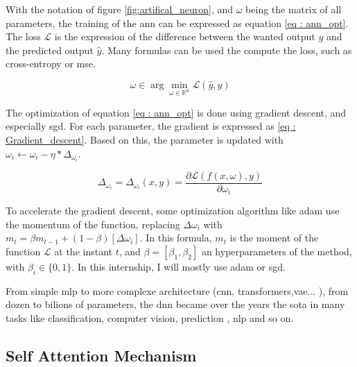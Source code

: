 With the notation of figure \ref{fig:artifical_neuron}, and $\omega$ being the matrix of all parameters, the training of the \acrshort{ann} can be expressed as equation \ref{eq : ann_opt}. The loss $\mathcal L$ is the expression of the difference between the wanted output $y$ and the predicted output $\hat y$. Many formulas can be used the compute the loss, such as cross-entropy\cite{zhang_generalized_2018} or \acrfull{mse}.

\begin{equation}
    \omega \in \arg \min_{\omega \in \mathbb R^n} \mathcal L(\hat{y},y)
    \label{eq : ann_opt}
\end{equation}

The optimization of equation \ref{eq : ann_opt} is done using gradient descent, and especially \acrfull{sgd}. For each parameter, the gradient is expressed as \ref{eq : Gradient_descent}. Based on this, the parameter is updated with $\omega_{i} \gets \omega_i - \eta * \Delta_{\omega_i}$.

\begin{equation}
    \Delta_{\omega_i}=\Delta_{\omega_i}(x,y)=\frac{\partial \mathcal L(f(x,\omega),y)}{\partial \omega_i}
\label{eq : Gradient_descent}
\end{equation}

To accelerate the gradient descent, some optimization algorithm like \acrfull{adam} \cite{kingma_adam_2017} use the momentum of the function, replacing $\Delta \omega_i$ with $m_t = \beta m_{t-1}+(1-\beta)[\Delta \omega_i]$. In this formula, $m_t$ is the moment of the function $\mathcal L$ at the instant $t$, and $\beta = [\beta_1, \beta_2]$ an hyperparameters of the method, with $\beta_i \in \{0,1\}$. In this internship, I will mostly use \acrshort{adam} or \acrshort{sgd}.

From simple \acrfull{mlp} to more complexe architecture (\acrfull{cnn}, \Glspl{transformer},\acrfull{vae}... ), from dozen to bilions of parameters, the \acrshort{dnn} became over the years the \acrfull{sota} in many tasks like classification\cite{zhang_neural_2000}, computer vision\cite{rawat_deep_2017}, prediction \cite{khosravi_comprehensive_2011}, \acrshort{nlp}\cite{goldberg_primer_2016} and so on.

\subsection{Self Attention Mechanism}
\label{sec:self_att}


